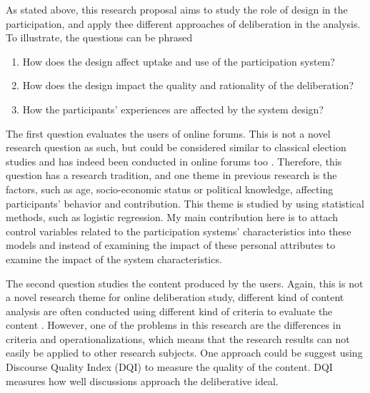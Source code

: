 \documentclass{article}
\begin{document}
As stated above, this research proposal aims to study the role of design in the participation, and apply thee different approaches of deliberation in the analysis. To illustrate, the questions can be phrased

\begin{enumerate}
\item How does the design affect uptake and use of the participation system?
\item How does the design impact the quality and rationality of the deliberation?
\item How the participants' experiences are affected by the system design?
\end{enumerate}

The first question evaluates the users of online forums. This is not a novel research question as such, but could be considered similar to classical election studies and has indeed been conducted in online forums too . Therefore, this question has a research tradition, and one theme in previous research is the factors, such as age, socio-economic status or political knowledge, affecting participants' behavior and contribution. This theme is studied by using statistical methods, such as logistic regression. My main contribution here is to attach control variables related to the participation systems' characteristics into these models and instead of examining the impact of these personal attributes to examine the impact of the system characteristics.

The second question studies the content produced by the users. Again, this is not a novel research theme for online deliberation study, different kind of content analysis are often conducted using different kind of criteria to evaluate the content . However, one of the problems in this research are the differences in criteria and operationalizations, which means that the research results can not easily be applied to other research subjects. One approach could be suggest using   Discourse Quality Index (DQI) to measure the quality of the content. DQI measures how well discussions approach the deliberative ideal. %
\end{document}
